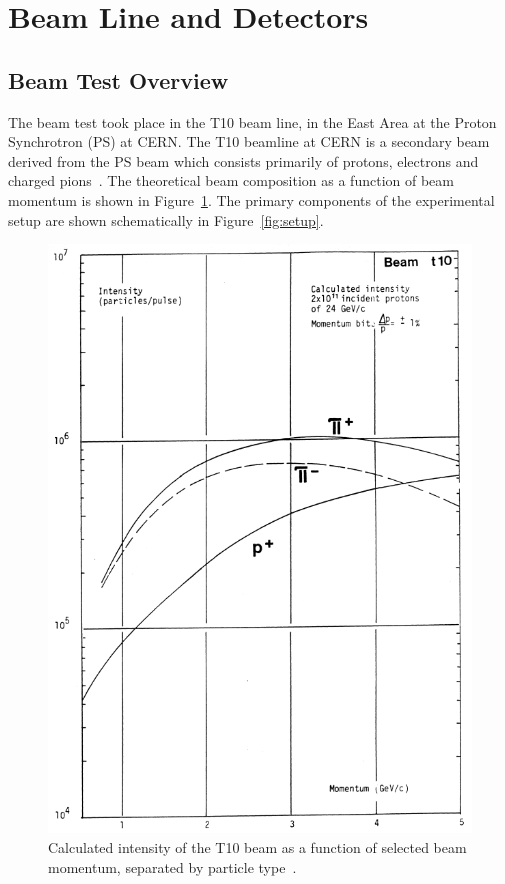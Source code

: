 \section{Beam Line and Detectors}
\label{hptpcPaper:sec:Methods}

\subsection{Beam Test Overview}
The beam test took place in the T10 beam line, in the East Area at the Proton Synchrotron (PS) at CERN.
The T10 beamline at CERN is a secondary beam derived from the PS beam which consists primarily of protons, electrons and charged pions~\cite{T10Report}.
The theoretical beam composition as a function of beam momentum is shown in Figure~\ref{fig:beamComp}.
The primary components of the experimental setup are shown schematically in Figure~\ref{fig:setup}.

\begin{figure}
  \centering
  \includegraphics[width=.6\linewidth]{files/Figures/t10Comp.png}
  \caption{Calculated intensity of the T10 beam as a function of selected beam momentum, separated by particle type~\cite{T10Report}.}
  \label{fig:beamComp}
\end{figure}

